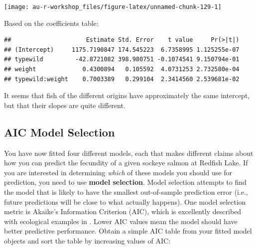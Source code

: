 \documentclass[]{book}
\newenvironment{Shaded}{\begin{snugshade}}{\end{snugshade}}
\newcommand{\KeywordTok}[1]{\textcolor[rgb]{0.13,0.29,0.53}{\textbf{#1}}}
\newcommand{\NormalTok}[1]{#1}
\newcommand{\OperatorTok}[1]{\textcolor[rgb]{0.81,0.36,0.00}{\textbf{#1}}}
\newcommand{\StringTok}[1]{\textcolor[rgb]{0.31,0.60,0.02}{#1}}
\begin{document}
\begin{center}\texttt{[image: au-r-workshop\_files/figure-latex/unnamed-chunk-129-1]} \end{center}

Based on the coefficients table:

\begin{Shaded}
\end{Shaded}

\begin{verbatim}
##                     Estimate Std. Error    t value     Pr(>|t|)
## (Intercept)     1175.7190847 174.545223  6.7358995 1.125255e-07
## typewild         -42.8721082 398.980751 -0.1074541 9.150794e-01
## weight             0.4300894   0.105592  4.0731253 2.732580e-04
## typewild:weight    0.7003389   0.299104  2.3414560 2.539681e-02
\end{verbatim}

It seems that fish of the different origins have approximately the same intercept, but that their slopes are quite different.

\hypertarget{aic-model-selection}{%
\subsection{AIC Model Selection}\label{aic-model-selection}}

You have now fitted four different models, each that makes different claims about how you can predict the fecundity of a given sockeye salmon at Redfish Lake. If you are interested in determining \emph{which} of these models you should use for prediction, you need to use \textbf{model selection}. Model selection attempts to find the model that is likely to have the smallest out-of-sample prediction error (i.e., future predictions will be close to what actually happens). One model selection metric is Akaike's Information Criterion (AIC), which is excellently described with ecological examples in \citet{aic-cite}. Lower AIC values mean the model should have better predictive performance. Obtain a simple AIC table from your fitted model objects and sort the table by increasing values of AIC:

\begin{Shaded}
\end{Shaded}
\end{document}
